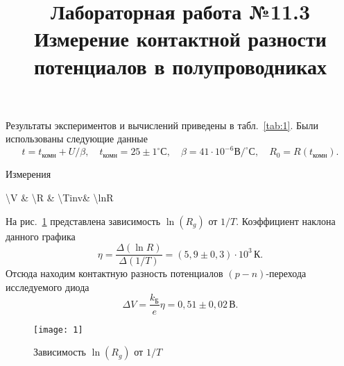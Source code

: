 \documentclass[a4paper]{article}
\title{Лабораторная работа №11.3\\
Измерение контактной разности потенциалов в полупроводниках}
\begin{document}
	\maketitle
Результаты экспериментов и вычислений приведены в табл.~\ref{tab:1}.
Были использованы следующие данные
\[
t=t_\text{комн}+U/\beta,\quad t_\text{комн}=25\pm 1 ^\circ \text{С},
\quad \beta=41\cdot 10^{-6} \text{В} / ^\circ \text{С},\quad
R_0=R(t_{\text{комн}})
.\] 
	\begin{table}[htpb]
		\centering
		\caption{Измерения}
		\label{tab:1}
		{\num{\V} & \num{\R} & \num{\Tinv}& \num{\lnR}}
	\end{table}
	На рис.~\ref{fig:1} представлена зависимость $\ln (R_g)$ 
	от $1 /T$. Коэффициент наклона данного графика
	\[
		\eta=\frac{\Delta(\ln R)}{\Delta(1 /T)}=(5,9\pm 0,3)
		\cdot 10^3\, \text{К}
	.\] 
	Отсюда находим контактную разность потенциалов $(p-n)$-перехода исследуемого диода
	\[
	\Delta V= \frac{k_\text{Б}}{e}\eta=0,51\pm 0,02\, \text{В}
	.\] 
\begin{figure}[htpb]
	\centering
	\texttt{[image: 1]}
	\caption{Зависимость $\ln(R_g)$ от $1 /T$}
	\label{fig:1}
\end{figure}
\end{document}
